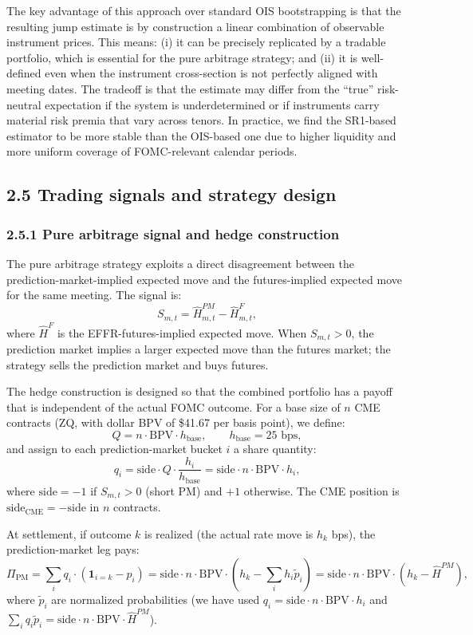 The key advantage of this approach over standard OIS bootstrapping is that the resulting jump estimate is by construction a linear combination of observable instrument prices. This means: (i) it can be precisely replicated by a tradable portfolio, which is essential for the pure arbitrage strategy; and (ii) it is well-defined even when the instrument cross-section is not perfectly aligned with meeting dates. The tradeoff is that the estimate may differ from the ``true'' risk-neutral expectation if the system is underdetermined or if instruments carry material risk premia that vary across tenors. In practice, we find the SR1-based estimator to be more stable than the OIS-based one due to higher liquidity and more uniform coverage of FOMC-relevant calendar periods.

\subsection*{2.5 Trading signals and strategy design}

\subsubsection*{2.5.1 Pure arbitrage signal and hedge construction}

The pure arbitrage strategy exploits a direct disagreement between the prediction-market-implied expected move and the futures-implied expected move for the same meeting. The signal is:
\[
S_{m,t} = \widehat{H}^{PM}_{m,t} - \widehat{H}^{F}_{m,t},
\]
where $\widehat{H}^{F}$ is the EFFR-futures-implied expected move. When $S_{m,t} > 0$, the prediction market implies a larger expected move than the futures market; the strategy sells the prediction market and buys futures.

The hedge construction is designed so that the combined portfolio has a payoff that is independent of the actual FOMC outcome. For a base size of $n$ CME contracts (ZQ, with dollar BPV of \$41.67 per basis point), we define:
\[
Q = n \cdot \text{BPV} \cdot h_\text{base}, \qquad h_\text{base} = 25\text{ bps},
\]
and assign to each prediction-market bucket $i$ a share quantity:
\[
q_i = \text{side} \cdot Q \cdot \frac{h_i}{h_\text{base}} = \text{side} \cdot n \cdot \text{BPV} \cdot h_i,
\]
where $\text{side} = -1$ if $S_{m,t} > 0$ (short PM) and $+1$ otherwise. The CME position is $\text{side}_\text{CME} = -\text{side}$ in $n$ contracts.

At settlement, if outcome $k$ is realized (the actual rate move is $h_k$ bps), the prediction-market leg pays:
\[
\Pi_\text{PM} = \sum_i q_i \cdot (\mathbf{1}_{i=k} - p_i) = \text{side} \cdot n \cdot \text{BPV} \cdot \left(h_k - \sum_i h_i \tilde{p}_i\right) = \text{side} \cdot n \cdot \text{BPV} \cdot (h_k - \widehat{H}^{PM}),
\]
where $\tilde{p}_i$ are normalized probabilities (we have used $q_i = \text{side} \cdot n \cdot \text{BPV} \cdot h_i$ and $\sum_i q_i \tilde{p}_i = \text{side} \cdot n \cdot \text{BPV} \cdot \widehat{H}^{PM}$).

